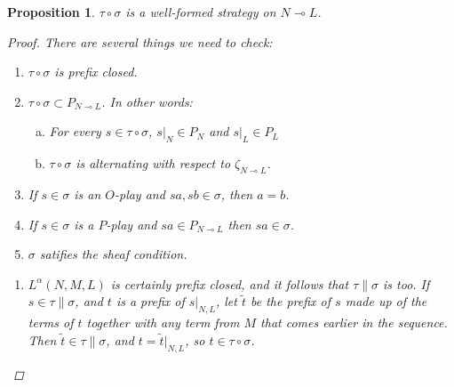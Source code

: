 \documentclass[11pt]{article} %
\theoremstyle{plain} %
\newtheorem{proposition}[theorem]{Proposition}
\theoremstyle{definition} %
\theoremstyle{exercisestyle}
\renewcommand{\implies}{\multimap}
\newcommand{\comp}[2]{#1 \circ #2}
\begin{document}
\begin{proposition}
  $\comp\tau\sigma$ is a well-formed strategy on $N\implies L$.
  \begin{proof}
    There are several things we need to check:
    \begin{enumerate}[1)]
      \item $\comp\tau\sigma$ is prefix closed.
      \item $\comp\tau\sigma\subset P_{N\implies L}$.  In other words:
        \begin{enumerate}[a)]
          \item For every $s\in\comp\tau\sigma$, $s\vert_N\in P_N$ and $s\vert_L\in P_L$
          \item $\comp\tau\sigma$ is alternating with respect to $\zeta_{N\implies L}$.
        \end{enumerate}
      \item If $s\in\sigma$ is an $O$-play and $sa,sb\in\sigma$, then $a=b$.
      \item If $s\in\sigma$ is a $P$-play and $sa\in P_{N\implies L}$ then $sa\in\sigma$.
      \item $\sigma$ satifies the sheaf condition.
    \end{enumerate}

    \begin{enumerate}[(1): ]
      \item $L^\alpha(N,M,L)$ is certainly prefix closed, and it follows that $\tau\|\sigma$ is too.  If $s\in\tau\|\sigma$, and $t$ is a prefix of $s\vert_{N,L}$, let $\tilde{t}$ be the prefix of $s$ made up of the terms of $t$ together with any term from $M$ that comes earlier in the sequence.  Then $\tilde{t}\in\tau\|\sigma$, and $t=\tilde{t}\vert_{N,L}$, so $t\in\comp\tau\sigma$.


\end{enumerate}
\end{proof}
\end{proposition}
\end{document}
